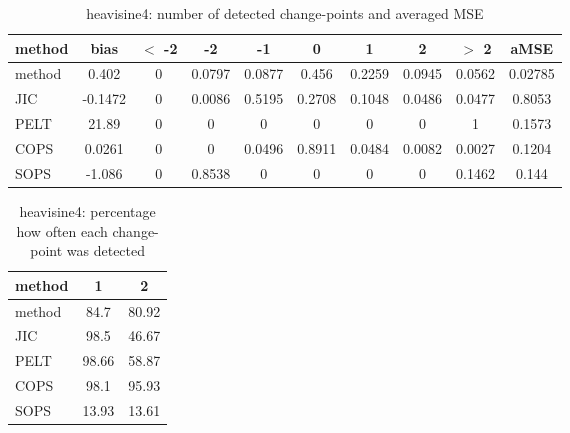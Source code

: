 \begin{table}[ht]
\centering
\begin{tabular}{l|c|ccccccc|c}
  \hline
method & bias & $<$ -2 & -2 & -1 & 0 & 1 & 2 & $>$ 2 & aMSE \\ 
  \hline
method & 0.402 &     0 & 0.0797 & 0.0877 & 0.456 & 0.2259 & 0.0945 & 0.0562 & 0.02785 \\ 
  JIC & -0.1472 &     0 & 0.0086 & 0.5195 & 0.2708 & 0.1048 & 0.0486 & 0.0477 & 0.8053 \\ 
  PELT & 21.89 &     0 &     0 &     0 &     0 &     0 &     0 &     1 & 0.1573 \\ 
  COPS & 0.0261 &     0 &     0 & 0.0496 & 0.8911 & 0.0484 & 0.0082 & 0.0027 & 0.1204 \\ 
  SOPS & -1.086 &     0 & 0.8538 &     0 &     0 &     0 &     0 & 0.1462 & 0.144 \\ 
   \hline
\end{tabular}
\caption{heavisine4: number of detected change-points and averaged MSE} 
\label{tab:heavisine4Njumps}
\end{table}
\begin{table}[ht]
\centering
\begin{tabular}{l|cc}
  \hline
method & 1 & 2 \\ 
  \hline
method &   84.7 &  80.92 \\ 
  JIC &   98.5 &  46.67 \\ 
  PELT &  98.66 &  58.87 \\ 
  COPS &   98.1 &  95.93 \\ 
  SOPS &  13.93 &  13.61 \\ 
   \hline
\end{tabular}
\caption{heavisine4: percentage how often each change-point was detected} 
\label{tab:heavisine4Detections}
\end{table}
